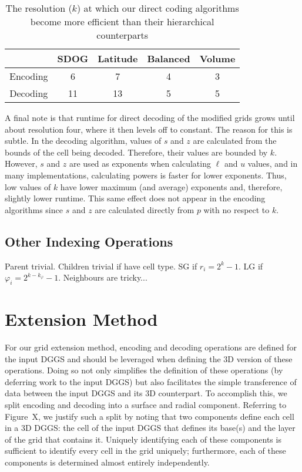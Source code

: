 \begin{table}[htp!]
	\centering
	\caption[Resolution at which direct coding becomes more efficient than hierarchical]{
		The resolution ($k$) at which our direct coding algorithms become more efficient than their hierarchical counterparts
	}
	\begin{tabular}{@{} c c c c c @{}}
		\toprule
		& SDOG & Latitude & Balanced & Volume \\ \midrule
		Encoding & 6    & 7        & 4        & 3      \\
		Decoding & 11   & 13       & 5        & 5      \\ \bottomrule
	\end{tabular}
	\label{tab:hierarch-vs-direct}
\end{table}


A final note is that runtime for direct decoding of the modified grids grows until about resolution four, where it then levels off to constant.
The reason for this is subtle.
In the decoding algorithm, values of $s$ and $z$ are calculated from the bounds of the cell being decoded.
Therefore, their values are bounded by $k$.
However, $s$ and $z$ are used as exponents when calculating $\ell$ and $u$ values, and in many implementations, calculating powers is faster for lower exponents.
Thus, low values of $k$ have lower maximum (and average) exponents and, therefore, slightly lower runtime.
This same effect does not appear in the encoding algorithms since $s$ and $z$ are calculated directly from $p$ with no respect to $k$.


\subsection{Other Indexing Operations}
Parent trivial.
Children trivial if have cell type. SG if $r_i = 2^k - 1$. LG if $\varphi_i = 2^{k - k_\varphi} - 1$.
Neighbours are tricky...


\section{Extension Method}
For our grid extension method, encoding and decoding operations are defined for the input DGGS and should be leveraged when defining the 3D version of these operations.
Doing so not only simplifies the definition of these operations (by deferring work to the input DGGS) but also facilitates the simple transference of data between the input DGGS and its 3D counterpart.
To accomplish this, we split encoding and decoding into a surface and radial component.
Referring to Figure~X, we justify such a split by noting that two components define each cell in a 3D DGGS: the cell of the input DGGS that defines its base(s) and the layer of the grid that contains it.
Uniquely identifying each of these components is sufficient to identify every cell in the grid uniquely; furthermore, each of these components is determined almost entirely independently.


